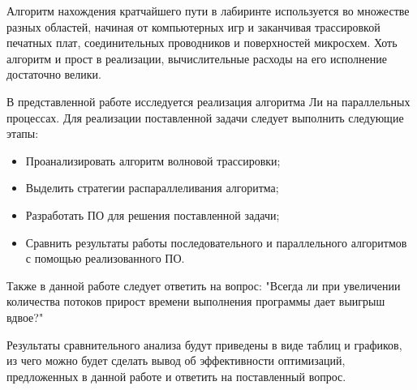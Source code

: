 \setcounter{page}{2}

Алгоритм нахождения кратчайшего пути в лабиринте используется во множестве разных областей, начиная от компьютерных игр и заканчивая  трассировкой печатных плат, соединительных проводников и поверхностей микросхем. Хоть алгоритм и прост в реализации, вычислительные расходы на его исполнение достаточно велики. 

В представленной работе исследуется реализация алгоритма Ли на параллельных процессах. Для реализации поставленной задачи следует выполнить следующие этапы:
\begin{itemize}
	\setlength{\itemsep}{1.2pt}
	\setlength{\parskip}{0pt}
	\setlength{\parsep}{0pt}
	\item Проанализировать алгоритм волновой трассировки;
	\item Выделить стратегии распараллеливания алгоритма;
	\item Разработать ПО для решения поставленной задачи;
	\item Сравнить результаты работы последовательного и параллельного алгоритмов с помощью реализованного ПО.
\end{itemize}
Также в данной работе следует ответить на вопрос: "Всегда ли при увеличении количества потоков прирост времени выполнения программы дает выигрыш вдвое?"


Результаты сравнительного анализа будут приведены в виде таблиц и графиков, из чего можно будет сделать вывод об эффективности оптимизаций, предложенных в данной работе и ответить на поставленный вопрос.